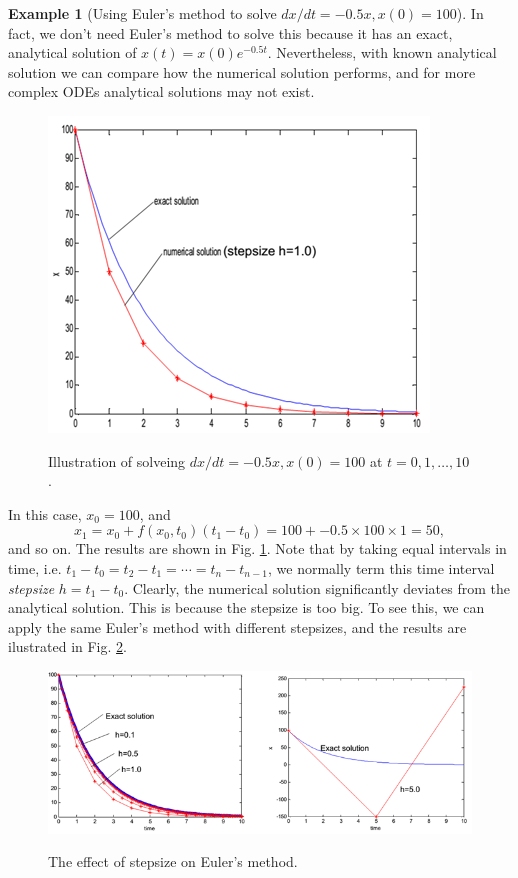 \documentclass[a4paper,11pt]{article}
\theoremstyle{definition}
\newtheorem{exmp}{Example}[section]
\begin{document}
\begin{exmp}[Using Euler's method to solve $dx/dt=-0.5 x, x(0) = 100$]
\label{exmp:euler}
In fact, we don't need Euler's method to solve this because it has an exact, analytical
solution of $x(t) = x(0) e^{-0.5 t}$. Nevertheless, with known analytical solution we
can compare how the numerical solution performs, and for more complex ODEs analytical solutions may not exist.

\begin{figure} [!h]
 \begin{center}
	\includegraphics[width=.45\textwidth]{euler}\\
 \end{center}
 \caption{Illustration of solveing $dx/dt=-0.5 x, x(0) = 100$ at $t=0, 1, \ldots, 10$.} 
 \label{fig:euler}
\end{figure}

In this case, $x_0 = 100$, and 
\[ 	x_1 = x_0 + f(x_0,t_0) (t_1 - t_0) = 100 + -0.5 \times 100 \times 1 = 50, \]
and so on.
The results are shown in Fig. \ref{fig:euler}. Note that by taking
equal intervals in time, i.e. $t_1-t_0 = t_2-t_1 = \cdots = t_n - t_{n-1}$,
we normally term this time interval \emph{stepsize} $h = t_1 - t_0$.
Clearly, the numerical solution significantly deviates from the analytical solution.
This is because the stepsize is too big. To see this, we can apply the same Euler's method
with different stepsizes, and the results are ilustrated in Fig. \ref{fig:euler_stepsize}.

\begin{figure} [!h]
 \begin{center}
	\includegraphics[width=.9\textwidth]{euler_stepsize}\\
 \end{center}
 \caption{The effect of stepsize on Euler's method.} 
 \label{fig:euler_stepsize}
\end{figure}

\end{exmp}
\end{document}
